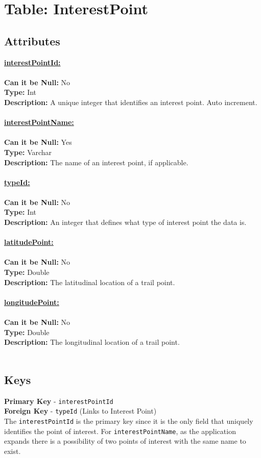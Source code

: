 \newpage
\section{Table: InterestPoint}
\subsection{Attributes}
\textbf{\underline{interestPointId:}}\\
\\
\textbf{Can it be Null:} No\\
\textbf{Type:} Int\\
\textbf{Description:} A unique integer that identifies an interest point. Auto increment.\\\\
\textbf{\underline{interestPointName:}}\\
\\
\textbf{Can it be Null:} Yes\\
\textbf{Type:} Varchar\\
\textbf{Description:} The name of an interest point, if applicable. \\\\
\textbf{\underline{typeId:}}\\
\\
\textbf{Can it be Null:} No\\
\textbf{Type:} Int\\
\textbf{Description:} An integer that defines what type of interest point the data is. \\\\
\textbf{\underline{latitudePoint:}}\\
\\
\textbf{Can it be Null:} No\\
\textbf{Type:} Double\\
\textbf{Description:}
The latitudinal location of a trail point. \\\\
\textbf{\underline{longitudePoint:}}\\
\\
\textbf{Can it be Null:} No\\
\textbf{Type:} Double\\
\textbf{Description:}
The longitudinal location of a trail point.\\\\
\subsection{Keys}
\textbf{Primary Key} - \texttt{interestPointId}\\
\textbf{Foreign Key} - \texttt{typeId} (Links to Interest Point)\\
The \texttt{interestPointId} is the primary key since it is the only field
that uniquely identifies the point of interest. For 
\texttt{interestPointName}, as the application expands there is a possibility of two points of interest with the same name to exist. 

